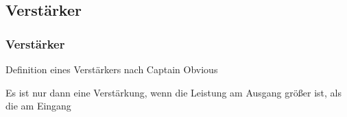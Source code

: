 
\subsection*{Verstärker}
\begin{frame}
\frametitle{Verstärker}
\begin{block}{Definition eines Verstärkers nach Captain Obvious}
  \begin{Large}
    Es ist nur dann eine Verstärkung, wenn die Leistung am Ausgang größer ist, als die am Eingang
  \end{Large}
\end{block}
\end{frame}


